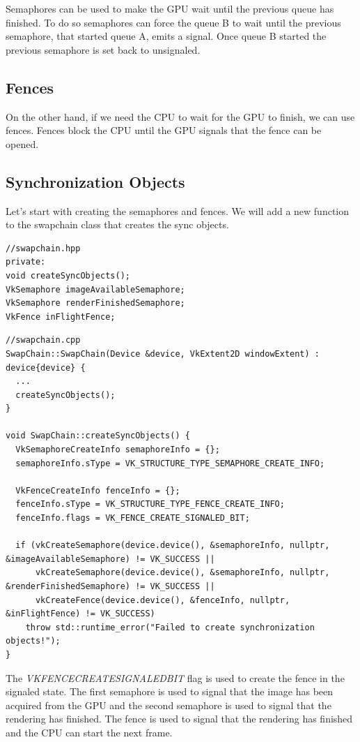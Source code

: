 \documentclass[12pt]{report} \usepackage{preamble}
\begin{document}
Semaphores can be used to make the GPU wait until the previous queue has finished. To do so semaphores can force the
queue B to wait until the previous semaphore, that started queue A, emits a signal. Once queue B started the previous semaphore
is set back to unsignaled.

\subsection{Fences}

On the other hand, if we need the CPU to wait for the GPU to finish, we can use fences. Fences block the CPU until the GPU
signals that the fence can be opened.

\subsection{Synchronization Objects}

Let's start with creating the semaphores and fences. We will add a new function to the swapchain class that creates the sync objects.

\begin{lstlisting}[Language=C++]
//swapchain.hpp
private:
void createSyncObjects();
VkSemaphore imageAvailableSemaphore;
VkSemaphore renderFinishedSemaphore;
VkFence inFlightFence;
\end{lstlisting}

\begin{lstlisting}[Language=C++]
//swapchain.cpp
SwapChain::SwapChain(Device &device, VkExtent2D windowExtent) : device{device} {
  ...
  createSyncObjects();
}

void SwapChain::createSyncObjects() {
  VkSemaphoreCreateInfo semaphoreInfo = {};
  semaphoreInfo.sType = VK_STRUCTURE_TYPE_SEMAPHORE_CREATE_INFO;

  VkFenceCreateInfo fenceInfo = {};
  fenceInfo.sType = VK_STRUCTURE_TYPE_FENCE_CREATE_INFO;
  fenceInfo.flags = VK_FENCE_CREATE_SIGNALED_BIT;

  if (vkCreateSemaphore(device.device(), &semaphoreInfo, nullptr, &imageAvailableSemaphore) != VK_SUCCESS ||
      vkCreateSemaphore(device.device(), &semaphoreInfo, nullptr, &renderFinishedSemaphore) != VK_SUCCESS ||
      vkCreateFence(device.device(), &fenceInfo, nullptr, &inFlightFence) != VK_SUCCESS)
    throw std::runtime_error("Failed to create synchronization objects!");
}
\end{lstlisting}

The \textit{VK\textunderscore FENCE\textunderscore CREATE\textunderscore SIGNALED\textunderscore BIT} flag is used to create the fence
in the signaled state. The first semaphore is used to signal that the image has been acquired from the \ac{GPU} and the second semaphore
is used to signal that the rendering has finished. The fence is used to signal that the rendering has finished and the CPU can
start the next frame.
\end{document}
